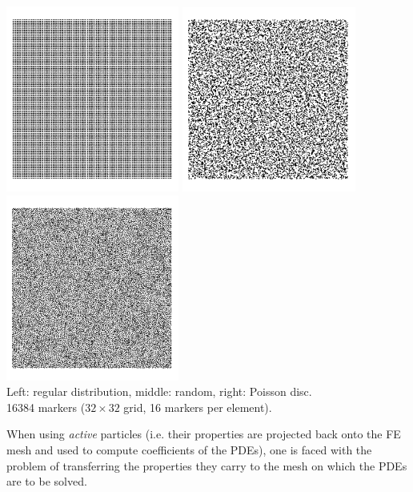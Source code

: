 \begin{center}
\includegraphics[width=5.7cm]{python_codes/fieldstone_13/images/markers_reg} 
\includegraphics[width=5.7cm]{python_codes/fieldstone_13/images/markers_rand} 
\includegraphics[width=5.7cm]{python_codes/fieldstone_13/images/markers_pd} \\
{\captionfont Left: regular distribution, middle: random, right: Poisson disc.\\
 16384 markers ($32 \times 32$ grid, 16 markers per element).}
\end{center}


When using {\it active} particles (i.e. their properties are projected 
back onto the FE mesh and used to compute coefficients of the PDEs), 
one is faced with the problem of transferring the properties they carry to 
the mesh on which the PDEs are to be solved. 

